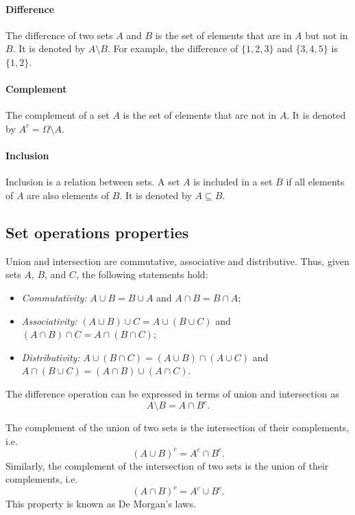 \paragraph{Difference}  The difference of two sets $A$ and $B$ is the set of elements
that are in $A$ but not in $B$.  It is denoted by $A \setminus B$.  For example, the
difference of $\{1, 2, 3\}$ and $\{3, 4, 5\}$ is $\{1, 2\}$.

\paragraph{Complement}  The complement of a set $A$ is the set of elements that are not
in $A$.  It is denoted by $A^c = \Omega \setminus A$.

\paragraph{Inclusion}  Inclusion is a relation between sets.  A set $A$ is included in a
set $B$ if all elements of $A$ are also elements of $B$.  It is denoted by $A \subseteq B$.

\subsection{Set operations properties}

Union and intersection are commutative, associative and distributive.  Thus, given sets
$A$, $B$, and $C$, the following statements hold:
\begin{itemize}
  \item \emph{Commutativity:} $A \cup B = B \cup A$ and $A \cap B = B \cap A$;
  \item \emph{Associativity:} $(A \cup B) \cup C = A \cup (B \cup C)$ and $(A \cap B) \cap C = A \cap (B \cap C)$;
  \item \emph{Distributivity:} $A \cup (B \cap C) = (A \cup B) \cap (A \cup C)$ and $A \cap (B \cup C) = (A \cap B) \cup (A \cap C)$.
\end{itemize}

The difference operation can be expressed in terms of union and intersection as
\[
  A \setminus B = A \cap B^c\text{.}
\]

The complement of the union of two sets is the intersection of their complements, i.e.
\[
  (A \cup B)^c = A^c \cap B^c\text{.}
\]
Similarly, the complement of the intersection of two sets is the union of their complements, i.e.
\[
  (A \cap B)^c = A^c \cup B^c\text{.}
\]
This property is known as De Morgan's laws.

